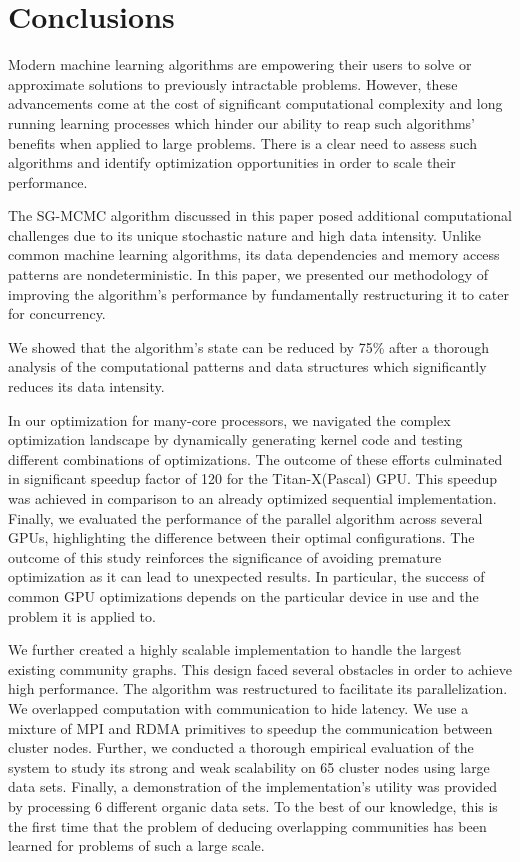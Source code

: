 \section{Conclusions}
\label{sec-conclusion}

Modern machine learning algorithms are empowering their
users to solve or approximate solutions to previously intractable problems.
However, these advancements come at the cost of significant computational
complexity and long running learning processes which hinder our ability to reap
such algorithms' benefits when applied to large problems. There is a clear need
to assess such algorithms and identify optimization opportunities in order to
scale their performance.

The SG-MCMC algorithm discussed in this paper posed additional computational
challenges due to its unique stochastic nature and high data intensity. Unlike
common machine learning algorithms, its data dependencies and memory access
patterns are nondeterministic. In this paper, we presented our methodology of
improving the algorithm's performance by fundamentally restructuring it to
cater for concurrency.

We showed that the algorithm's state can be reduced by 75\% after a thorough
analysis of the computational patterns and data structures which significantly
reduces its data intensity.

In our optimization for many-core processors, we navigated the complex optimization
landscape by dynamically generating kernel code and testing different
combinations of optimizations. The outcome of these efforts culminated in
significant speedup factor of 120 for the \mbox{Titan-X(Pascal)} GPU.
This speedup was achieved in comparison to an already
optimized sequential implementation. Finally, we evaluated the performance of
the parallel algorithm across several GPUs, highlighting the difference between
their optimal configurations.
%
The outcome of this study reinforces the significance of avoiding premature
optimization as it can lead to unexpected results. In particular, the success
of common GPU optimizations depends on the particular device in use and the
problem it is applied to.

We further created a highly scalable implementation to handle the largest existing
community graphs.
This design faced
several obstacles in order to achieve high performance.
The algorithm was restructured to facilitate its
parallelization. We overlapped computation
with communication to hide latency.  We use a
mixture of MPI and RDMA primitives to speedup the communication between cluster
nodes.
%
Further, we conducted a thorough empirical evaluation of the system to study its strong
and weak scalability on 65 cluster nodes using large data sets.
Finally, a
demonstration of the implementation's utility was provided by processing 6
different organic data sets.
To the best of
our knowledge, this is the first time that the problem of deducing overlapping
communities has been learned for problems of such a large scale.
